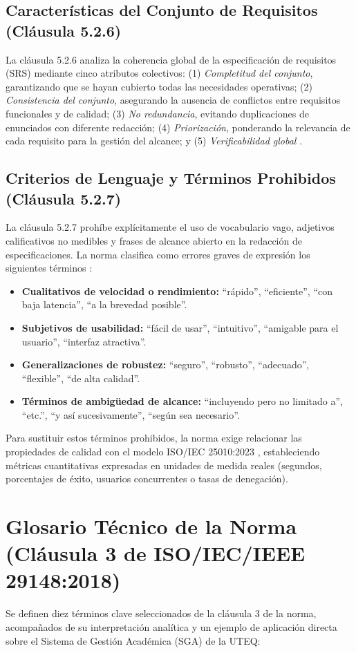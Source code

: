 \documentclass[conference]{IEEEtran}
\begin{document}
	\subsection{Características del Conjunto de Requisitos (Cláusula 5.2.6)}
	La cláusula 5.2.6 analiza la coherencia global de la especificación de requisitos (SRS) mediante cinco atributos colectivos: (1) \emph{Completitud del conjunto}, garantizando que se hayan cubierto todas las necesidades operativas; (2) \emph{Consistencia del conjunto}, asegurando la ausencia de conflictos entre requisitos funcionales y de calidad; (3) \emph{No redundancia}, evitando duplicaciones de enunciados con diferente redacción; (4) \emph{Priorización}, ponderando la relevancia de cada requisito para la gestión del alcance; y (5) \emph{Verificabilidad global} \cite{ieee29148, swebok2024}.
	
	\subsection{Criterios de Lenguaje y Términos Prohibidos (Cláusula 5.2.7)}
	La cláusula 5.2.7 prohíbe explícitamente el uso de vocabulario vago, adjetivos calificativos no medibles y frases de alcance abierto en la redacción de especificaciones. La norma clasifica como errores graves de expresión los siguientes términos \cite{ieee29148}:
	\begin{itemize}
		\item \textbf{Cualitativos de velocidad o rendimiento:} ``rápido'', ``eficiente'', ``con baja latencia'', ``a la brevedad posible''.
		\item \textbf{Subjetivos de usabilidad:} ``fácil de usar'', ``intuitivo'', ``amigable para el usuario'', ``interfaz atractiva''.
		\item \textbf{Generalizaciones de robustez:} ``seguro'', ``robusto'', ``adecuado'', ``flexible'', ``de alta calidad''.
		\item \textbf{Términos de ambigüedad de alcance:} ``incluyendo pero no limitado a'', ``etc.'', ``y así sucesivamente'', ``según sea necesario''.
	\end{itemize}
	Para sustituir estos términos prohibidos, la norma exige relacionar las propiedades de calidad con el modelo ISO/IEC 25010:2023 \cite{iso25010}, estableciendo métricas cuantitativas expresadas en unidades de medida reales (segundos, porcentajes de éxito, usuarios concurrentes o tasas de denegación).
	
	\section{Glosario Técnico de la Norma (Cláusula 3 de ISO/IEC/IEEE 29148:2018)}
	Se definen diez términos clave seleccionados de la cláusula 3 de la norma, acompañados de su interpretación analítica y un ejemplo de aplicación directa sobre el Sistema de Gestión Académica (SGA) de la UTEQ:
	
\end{document}
